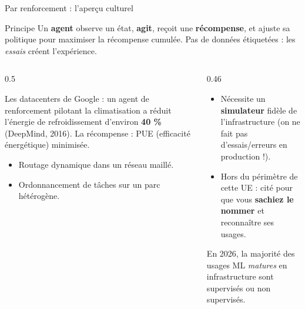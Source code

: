 \begin{frame}{Par renforcement : l'aperçu culturel}
\begin{block}{Principe}
Un \textbf{agent} observe un état, \textbf{agit}, reçoit une \textbf{récompense},
et ajuste sa politique pour maximiser la récompense cumulée.
Pas de données étiquetées : les \emph{essais} créent l'expérience.
\end{block}
\begin{columns}[t]
\begin{column}{0.5\textwidth}
\begin{ebox}
Les datacenters de Google : un agent de renforcement pilotant la
climatisation a réduit l'énergie de refroidissement d'environ \textbf{40 \%}
(DeepMind, 2016). La récompense : PUE (efficacité énergétique) minimisée.
\end{ebox}
\begin{ebox}
\begin{itemize}
\item Routage dynamique dans un réseau maillé.
\item Ordonnancement de tâches sur un parc hétérogène.
\end{itemize}
\end{ebox}
\end{column}
\begin{column}{0.46\textwidth}
\begin{wbox}
\begin{itemize}
\item Nécessite un \textbf{simulateur} fidèle de l'infrastructure
(on ne fait pas d'essais/erreurs en production !).
\item Hors du périmètre de cette UE : cité pour que vous
\textbf{sachiez le nommer} et reconnaître ses usages.
\end{itemize}
\end{wbox}
\begin{center}\small
En 2026, la majorité des usages ML \emph{matures} en infrastructure
sont supervisés ou non supervisés.
\end{center}
\end{column}
\end{columns}
\end{frame}

